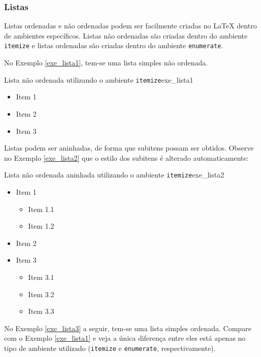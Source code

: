 \subsubsection*{Listas}
\label{sec:listas}

Listas ordenadas e não ordenadas podem ser facilmente criadas no \LaTeX{} dentro de ambientes específicos. Listas não ordenadas são criadas dentro do ambiente \texttt{itemize} e listas ordenadas são criadas dentro do ambiente \texttt{enumerate}.

No Exemplo \ref{exe_lista1}, tem-se uma lista simples não ordenada.

\begin{texexptitled}[breakable,enhanced,middle=2mm]{Lista não ordenada utilizando o ambiente \texttt{itemize}}{exe_lista1}
\begin{itemize}
    \item Item 1
    \item Item 2
    \item Item 3
\end{itemize}
\end{texexptitled}

Listas podem ser aninhadas, de forma que subitens possam ser obtidos. Observe no Exemplo \ref{exe_lista2} que o estilo dos subitens é alterado automaticamente:

\begin{texexptitled}[breakable,enhanced,middle=2mm]{Lista não ordenada aninhada utilizando o ambiente \texttt{itemize}}{exe_lista2}
\begin{itemize}
    \item Item 1
    \begin{itemize}
        \item Item 1.1
        \item Item 1.2
    \end{itemize}
    \item Item 2
    \item Item 3
    \begin{itemize}
        \item Item 3.1
        \item Item 3.2
        \item Item 3.3
    \end{itemize}
\end{itemize}
\end{texexptitled}

No Exemplo \ref{exe_lista3} a seguir, tem-se uma lista simples ordenada. Compare com o Exemplo \ref{exe_lista1} e veja a única diferença entre eles está apenas no tipo de ambiente utilizado ({\tt itemize} e {\tt enumerate}, respectivamente).

